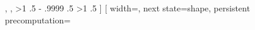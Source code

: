 {{        \expandafter\pgf@x\pgf@lib@shapedecoration@sep,\pgf@stop%
        \edef\pgf@lib@shapedecoration@sep{\the\pgf@x}%
      \else%
        \def\pgf@lib@shapedecoration@borderstext{by borders}%
        \afterassignment\pgf@lib@shapedecoration@setkeyword%
        \expandafter\c@pgf@counta\pgf@lib@shapedecoration@spread,\pgf@stop%
        \ifpgf@lib@shapedecoration@betweenborders%
          \ifnum\c@pgf@counta>1\relax%
            \advance{}\relax%
            \pgfmathsetlength{}%
            \ifpgfshapedecorationscaled%
              \pgfmathaddtolength{}%
            \else%
              \advance\pgf@x\pgf@x%
            \fi%
            \pgf@x.5\pgf@x%
            \multiply\pgf@x-\c@pgf@counta%
            \advance\pgf@x\pgfdecoratedremainingdistance%
            \divide\pgf@x\c@pgf@counta%
            \pgf@x.9999\pgf@x%
            \ifpgfshapedecorationscaled%
              \pgf@xa\pgf@lib@shapedecoration@widthchange\relax%
              \divide\pgf@xa\c@pgf@counta%
              \edef\pgf@lib@shapedecoration@specialwidth{\the\pgf@xa}%
            \fi%
          \else%
            \pgf@lib@shapedecoration@betweenbordersfalse%
            \pgf@x\pgfdecoratedremainingdistance%
            \ifnum{}\relax%
              \pgf@y.5\pgf@x%
              \edef\pgf@lib@shapedecoration@initialise{\the\pgf@y}%
            \else%
              \advance{}\relax%
              \edef\pgf@lib@shapedecoration@initialise{\the\pgf@x}%
            \fi%
          \fi%
        \else%
          \pgf@x\pgfdecoratedremainingdistance%
          \ifnum\c@pgf@counta>1\relax%
            \advance{}\relax%
            \divide\pgf@x\c@pgf@counta\relax%
          \else%
            \ifnum{}\relax%
              \pgf@y.5\pgf@x%
              \edef\pgf@lib@shapedecoration@initialise{\the\pgf@y}%
            \else%
              \advance{}\relax%
              \edef\pgf@lib@shapedecoration@initialise{\the\pgf@x}%
            \fi%
          \fi%
        \fi%
        \edef\pgf@lib@shapedecoration@sep{\the\pgf@x}%
      \fi%
    }]
  {}%
  [
    width=\pgf@lib@shapedecoration@beforeshape-1sp,
    next state=shape,
    persistent precomputation=
    {
      \ifpgfshapedecorationscaled%
        \ifpgf@lib@shapedecoration@betweenborders%
          \ifx\pgf@lib@shapedecoration@spread\pgfutil@empty%
            \pgf@x\pgfdecoratedcompleteddistance%
            \advance\pgf@x\pgfdecoratedremainingdistance%
}}
